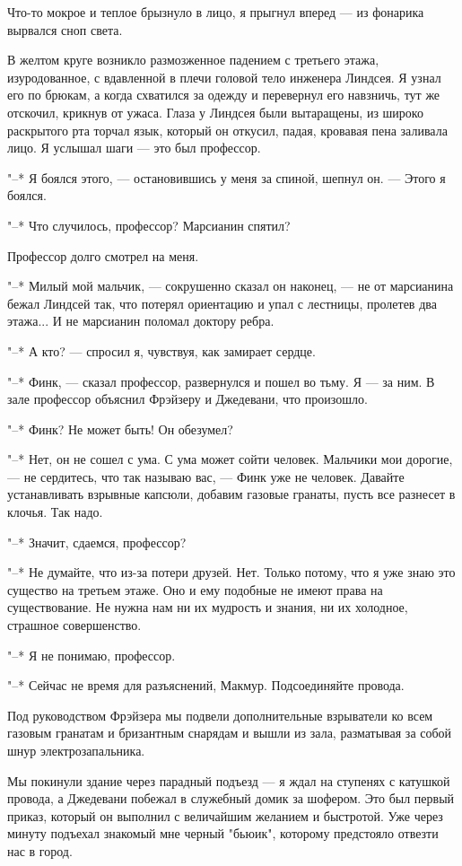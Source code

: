 Что-то мокрое и теплое брызнуло в лицо, я прыгнул вперед --- из  фонарика
вырвался сноп света.

В  желтом  круге  возникло  размозженное  падением  с  третьего  этажа,
изуродованное, с вдавленной в плечи головой тело инженера Линдсея. Я узнал
его по брюкам, а когда схватился за одежду и перевернул его навзничь,  тут
же отскочил, крикнув от ужаса. Глаза у Линдсея были вытаращены, из  широко
раскрытого рта торчал язык,  который  он  откусил,  падая,  кровавая  пена
заливала лицо. Я услышал шаги --- это был профессор.

"--* Я боялся этого, --- остановившись у меня за спиной, шепнул он. ---  Этого
я боялся.

"--* Что случилось, профессор? Марсианин спятил?

Профессор долго смотрел на меня.

"--* Милый мой мальчик, --- сокрушенно сказал он наконец, --- не от марсианина
бежал Линдсей так, что потерял ориентацию и упал с лестницы, пролетев  два
этажа... И не марсианин поломал доктору ребра.

"--* А кто? --- спросил я, чувствуя, как замирает сердце.

"--* Финк, --- сказал профессор, развернулся и пошел во тьму. Я --- за ним.  В
зале профессор объяснил Фрэйзеру и Джедевани, что произошло.

"--* Финк? Не может быть! Он обезумел?

"--* Нет, он не сошел с ума. С  ума  может  сойти  человек.  Мальчики  мои
дорогие, --- не сердитесь, что так называю  вас,  ---  Финк  уже  не  человек.
Давайте устанавливать взрывные капсюли, добавим газовые гранаты, пусть все
разнесет в клочья. Так надо.

"--* Значит, сдаемся, профессор?

"--* Не думайте, что из-за потери друзей. Нет. Только потому,  что  я  уже
знаю это существо на третьем этаже. Оно и ему подобные не имеют  права  на
существование. Не нужна нам ни их  мудрость  и  знания,  ни  их  холодное,
страшное совершенство.

"--* Я не понимаю, профессор.

"--* Сейчас не время для разъяснений, Макмур. Подсоединяйте провода.

Под руководством Фрэйзера мы подвели дополнительные взрыватели ко  всем
газовым гранатам и бризантным снарядам и  вышли  из  зала,  разматывая  за
собой шнур электрозапальника.

Мы покинули здание через парадный  подъезд  ---  я  ждал  на  ступенях  с
катушкой провода, а Джедевани побежал в служебный домик  за  шофером.  Это
был первый приказ, который он выполнил с величайшим желанием и  быстротой.
Уже через минуту подъехал знакомый мне черный "бьюик", которому предстояло
отвезти нас в город.

